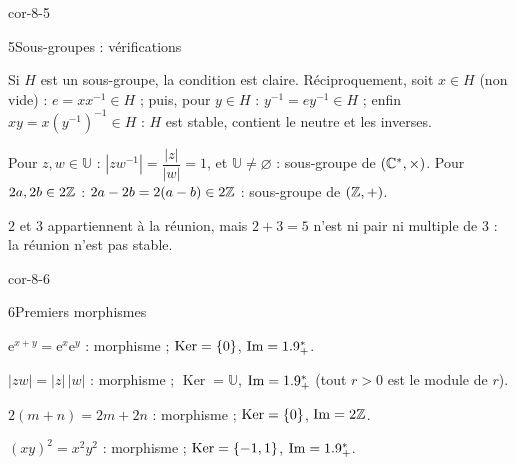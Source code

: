 \begin{blocLivre}{cor-8-5}
\begin{corrige}{5}{Sous-groupes : vérifications}
\begin{questions}
  \item Si $H$ est un sous-groupe, la condition est claire. Réciproquement,
    soit $x\in H$ (non vide) : $e=xx^{-1}\in H$ ; puis, pour $y\in H$ :
    $y^{-1}=ey^{-1}\in H$ ; enfin $xy=x(y^{-1})^{-1}\in H$ : $H$ est stable,
    contient le neutre et les inverses.
  \item Pour $z,w\in\mathbb{U}$ : $|zw^{-1}|=\dfrac{|z|}{|w|}=1$, et
    $\mathbb{U}\neq\varnothing$ : sous-groupe de $(\mathbb{C}^{*},\times)$.
    Pour $2a,2b\in2\mathbb{Z}$ : $2a-2b=2(a-b)\in2\mathbb{Z}$ : sous-groupe de $(\mathbb{Z},+)$.
  \item $2$ et $3$ appartiennent à la réunion, mais $2+3=5$ n'est ni pair
    ni multiple de $3$ : la réunion n'est pas stable.
\end{questions}
\end{corrige}
\end{blocLivre}

\begin{blocLivre}{cor-8-6}
\begin{corrige}{6}{Premiers morphismes}
\begin{questions}
  \item $\mathrm{e}^{x+y}=\mathrm{e}^{x}\mathrm{e}^{y}$ : morphisme ;
    $\operatorname{Ker}=\left\{0\right\}$, $\operatorname{Im}=1.9_{+}^{*}$.
  \item $|zw|=|z|\,|w|$ : morphisme ;
    $\operatorname{Ker}=\mathbb{U}$,
    $\operatorname{Im}=1.9_{+}^{*}$ (tout $r>0$ est le module de $r$).
  \item $2(m+n)=2m+2n$ : morphisme ; $\operatorname{Ker}=\left\{0\right\}$,
    $\operatorname{Im}=2\mathbb{Z}$.
  \item $(xy)^{2}=x^{2}y^{2}$ : morphisme ;
    $\operatorname{Ker}=\left\{-1,1\right\}$, $\operatorname{Im}=1.9_{+}^{*}$.
\end{questions}
\end{corrige}
\end{blocLivre}

